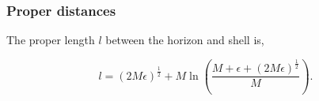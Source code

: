 \documentclass[aps,showpacs,twocolumn,floats,prd,superscriptaddress,nofootinbib]{revtex4-1}
\begin{document}
%

%

%
%
%
%
%
%

\subsubsection{Proper distances}

The proper length $l$ between the horizon and shell is,

\begin{equation}
	l =  (2M \epsilon)^\frac{1}{2}  + M \ln \left( \frac{M + \epsilon + (2M\epsilon)^\frac{1}{2}}{M} \right).	\label{20}
\end{equation}
\end{document}
